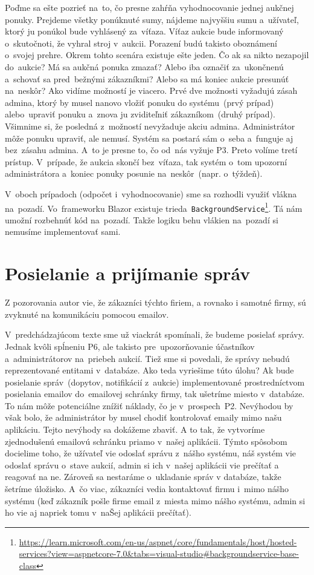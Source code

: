Poďme sa ešte pozrieť na~to, čo presne zahŕňa vyhodnocovanie jednej aukčnej ponuky. Prejdeme všetky ponúknuté sumy, nájdeme najvyššiu sumu a~užívateľ, ktorý ju ponúkol bude vyhlásený za~víťaza. Víťaz aukcie bude informovaný o~skutočnoti, že vyhral stroj v~aukcii. Porazení budú takisto oboznámení o~svojej prehre. Okrem tohto scenára existuje ešte jeden. Čo ak sa nikto nezapojil do~aukcie? Má sa aukčná ponuka zmazať? Alebo iba označiť za~ukončnenú a~schovať sa pred~bežnými zákazníkmi? Alebo sa má koniec aukcie presunúť na~neskôr? Ako vidíme možností je viacero. Prvé dve možnosti vyžadujú zásah admina, ktorý by musel nanovo vložiť ponuku do systému~(prvý prípad) alebo~upraviť ponuku a~znova ju zviditeľniť zákazníkom~(druhý prípad). Všimnime si, že posledná z~možností nevyžaduje akciu admina. Administrátor môže ponuku upraviť, ale nemusí. Systém sa postará sám o~seba a~funguje aj bez~zásahu admina. A~to je presne to, čo od~nás vyžuje P3. Preto volíme tretí prístup. V~prípade, že aukcia skončí bez~víťaza, tak systém o~tom upozorní administrátora a~koniec ponuky posunie na~neskôr~(napr. o~týždeň).

V~oboch prípadoch (odpočet i~vyhodnocovanie) sme sa rozhodli využiť vlákna na~pozadí. Vo~frameworku Blazor existuje trieda~\verb|BackgroundService|\footnote{\url{https://learn.microsoft.com/en-us/aspnet/core/fundamentals/host/hosted-services?view=aspnetcore-7.0&tabs=visual-studio\#backgroundservice-base-class}}. Tá nám umožní rozbehnúť kód na~pozadí. Takže logiku behu vlákien na~pozadí si nemusíme implementovať sami.

\section{Posielanie a prijímanie správ}

Z pozorovania autor vie, že zákazníci týchto firiem, a rovnako i samotné firmy, sú zvyknuté na komunikáciu pomocou emailov.

V~predchádzajúcom texte sme už viackrát spomínali, že budeme posielať správy. Jednak kvôli spĺneniu P6, ale takisto pre~upozorňovanie účastníkov a~administrátorov na~priebeh aukcií. Tiež sme si povedali, že správy nebudú reprezentované entitami v~databáze. Ako teda vyriešime túto úlohu? Ak bude posielanie správ~(dopytov, notifikácií z~aukcie) implementované prostredníctvom posielania emailov do~emailovej schránky firmy, tak ušetríme miesto v~databáze. To nám môže potenciálne znížiť náklady, čo je v~prospech~P2. Nevýhodou by však bolo, že administrátor by musel chodiť kontrolovať emaily mimo našu aplikáciu. Tejto nevýhody sa dokážeme zbaviť. A to tak, že vytvoríme zjednodušenú emailovú schránku priamo v~našej aplikácii. Týmto spôsobom docielime toho, že užívateľ vie odoslať správu z~nášho systému, náš systém vie odoslať správu o~stave aukcií, admin si ich v~našej aplikácii vie prečítať a reagovať na ne. Zároveň sa nestaráme o~ukladanie správ v databáze, takže šetríme úložisko. A~čo viac, zákazníci vedia kontaktovať firmu i~mimo nášho systému (keď zákazník pošle firme email z~miesta mimo nášho systému, admin si ho vie aj napriek tomu v~naŠej aplikácii prečítať).

